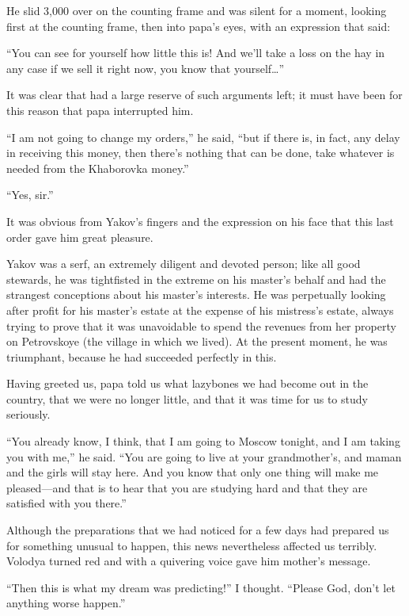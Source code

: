 He slid 3,000 over on the counting frame and was silent for a moment, looking first at the counting frame, then into papa's eyes, with an expression that said:

``You can see for yourself how little this is! And we'll take a loss on the hay in any case if we sell it right now, you know that yourself\ldots{}'' %

It was clear that had a large reserve of such arguments left; it must have been for this reason that papa interrupted him.

``I am not going to change my orders,'' he said, ``but if there is, in fact, any delay in receiving this money, then there's nothing that can be done, take whatever is needed from the Khaborovka money.'' %

``Yes, sir.'' %

It was obvious from Yakov's fingers and the expression on his face that this last order gave him great pleasure.

Yakov was a serf, an extremely diligent and devoted person; like all good stewards, he was tightfisted in the extreme on his master's behalf and had the strangest conceptions about his master's interests. He was perpetually looking after profit for his master's estate at the expense of his mistress's estate, always trying to prove that it was unavoidable to spend the revenues from her property on Petrovskoye (the village in which we lived). At the present moment, he was triumphant, because he had succeeded perfectly in this.

Having greeted us, papa told us what lazybones we had become out in the country, that we were no longer little, and that it was time for us to study seriously.

``You already know, I think, that I am going to Moscow tonight, and I am taking you with me,'' he said. ``You are going to live at your grandmother's, and maman and the girls will stay here. And you know that only one thing will make me pleased---and that is to hear that you are studying hard and that they are satisfied with you there.'' %

Although the preparations that we had noticed for a few days had prepared us for something unusual to happen, this news nevertheless affected us terribly. Volodya turned red and with a quivering voice gave him mother's message.

``Then this is what my dream was predicting!'' I thought. ``Please God, don't let anything worse happen.'' %

